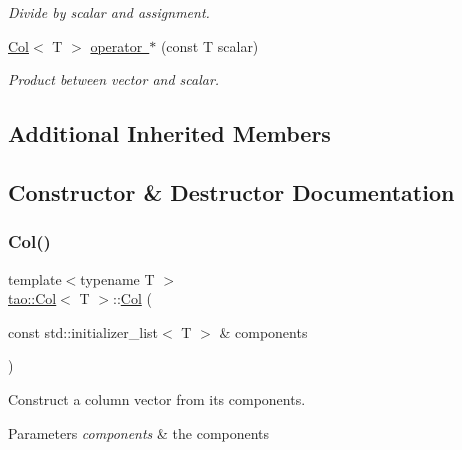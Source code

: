 \begin{DoxyCompactItemize}
\begin{DoxyCompactList}\small\item\em Divide by scalar and assignment. \end{DoxyCompactList}\item 
\mbox{\hyperlink{classtao_1_1_col}{Col}}$<$ T $>$ \mbox{\hyperlink{classtao_1_1_col_a734ed22497ede69a2ed0f791bd503355}{operator $\ast$}} (const T scalar)
\begin{DoxyCompactList}\small\item\em Product between vector and scalar. \end{DoxyCompactList}\end{DoxyCompactItemize}
\subsection*{Additional Inherited Members}


\subsection{Constructor \& Destructor Documentation}
\mbox{\label{classtao_1_1_col_a9133bec2b352e2e139e51e1f9107473d}} 
\subsubsection{\texorpdfstring{Col()}{Col()}\hspace{0.1cm}{\footnotesize\ttfamily [1/2]}}
{\footnotesize\ttfamily template$<$typename T $>$ \\
\mbox{\hyperlink{classtao_1_1_col}{tao\+::\+Col}}$<$ T $>$\+::\mbox{\hyperlink{classtao_1_1_col}{Col}} (\begin{DoxyParamCaption}\item[{const std\+::initializer\+\_\+list$<$ T $>$ \&}]{components }\end{DoxyParamCaption})}



Construct a column vector from its components. 


\begin{DoxyParams}{Parameters}
{\em components} & the components \\
\hline
\end{DoxyParams}
\mbox{\label{classtao_1_1_col_a6015ff83a28c5289050171e762e174fc}} 
